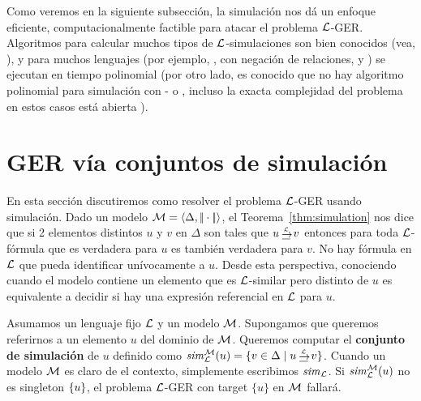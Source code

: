 Como veremos en la siguiente subsecci\'on, la simulaci\'on nos d\'a un
enfoque eficiente, computacionalmente factible para atacar el problema $\mathcal{L}$-GER. Algoritmos para calcular muchos tipos de $\mathcal{L}$-simulaciones son
bien conocidos (vea, \cite{H71,areces08,HHK95,DPP03}), y para muchos
lenguajes (por ejemplo, \ALC, \ALC con negaci\'on de relaciones, \ELAN y \EL)
se ejecutan en tiempo polinomial (por otro lado, es conocido que no hay algoritmo polinomial 
 para simulaci\'on con \FOL- o \EPFOL, incluso la exacta
complejidad del problema en estos casos est\'a abierta \cite{gare:comp79}).

\section{GER v\'ia conjuntos de simulaci\'on}\label{sec:simulation}
\label{sec:greViaSimulacion}
En esta secci\'on discutiremos como resolver el problema $\mathcal{L}$-GER
usando simulaci\'on. Dado un modelo $\mathcal{M} = \langle \Delta,
|\!|\cdot|\!| \rangle$, el Teorema~\ref{thm:simulation} nos dice que si 2 elementos distintos $u$ y $v$ en $\Delta$ son tales que $u
\simul{\+L} v$ entonces para toda $\mathcal{L}$-f\'ormula que es verdadera para $u$ es tambi\'en verdadera para $v$. No hay f\'ormula en $\mathcal{L}$ que pueda identificar un\'ivocamente a $u$. Desde esta perspectiva, conociendo cuando el modelo contiene un elemento que es $\mathcal{L}$-similar pero distinto de $u$ es
equivalente a decidir si hay una expresi\'on referencial en $\mathcal{L}$ para $u$.


Asumamos un lenguaje fijo $\mathcal{L}$ y un modelo $\mathcal{M}$. Supongamos que queremos referirnos a un elemento $u$ del dominio de $\mathcal{M}$. Queremos computar el {\bf conjunto de simulaci\'on} de $u$ definido como
$\simset_{\+L}^{\+M}(u) = \cset{v \in \Delta \mid u \simul{\+L} v}$.
Cuando un modelo $\mathcal{M}$ es claro de el contexto, simplemente escribimos ${\it sim}_{\mathcal{L}}$.
 Si ${\it sim}_{\mathcal{L}}^{\mathcal{M}}(u)$ no es singleton $\{u\}$,
el problema $\mathcal{L}$-GER con target $\{u\}$ en $\mathcal{M}$ fallar\'a.

%



